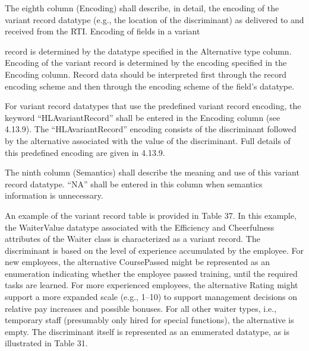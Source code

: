 The eighth column (Encoding) shall describe, in detail, the encoding of the variant record datatype (e.g., the location of the discriminant) as delivered to and received from the RTI. Encoding of fields in a variant

\newpage
\noindent record is determined by the datatype specified in the Alternative type column. Encoding of the variant record is determined by the encoding specified in the Encoding column. Record data should be interpreted first through the record encoding scheme and then through the encoding scheme of the field's datatype.

For variant record datatypes that use the predefined variant record encoding, the keyword ``HLAvariantRecord'' shall be entered in the Encoding column (see 4.13.9). The ``HLAvariantRecord'' encoding consists of the discriminant followed by the alternative associated with the value of the discriminant. Full details of this predefined encoding are given in 4.13.9.

The ninth column (Semantics) shall describe the meaning and use of this variant record datatype. ``NA'' shall be entered in this column when semantics information is unnecessary.

An example of the variant record table is provided in Table 37. In this example, the WaiterValue datatype associated with the Efficiency and Cheerfulness attributes of the Waiter class is characterized as a variant record. The discriminant is based on the level of experience accumulated by the employee. For new employees, the alternative CoursePassed might be represented as an enumeration indicating whether the employee passed training, until the required tasks are learned. For more experienced employees, the alternative Rating might support a more expanded scale (e.g., 1--10) to support management decisions on relative pay increases and possible bonuses. For all other waiter types, i.e., temporary staff (presumably only hired for special functions), the alternative is empty. The discriminant itself is represented as an enumerated datatype, as is illustrated in Table 31.

